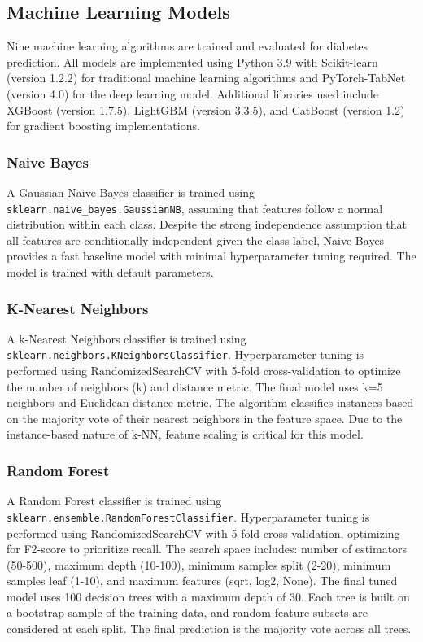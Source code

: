 \subsection{Machine Learning Models}

Nine machine learning algorithms are trained and evaluated for diabetes prediction. All models are implemented using Python 3.9 with Scikit-learn (version 1.2.2) for traditional machine learning algorithms and PyTorch-TabNet (version 4.0) for the deep learning model. Additional libraries used include XGBoost (version 1.7.5), LightGBM (version 3.3.5), and CatBoost (version 1.2) for gradient boosting implementations.

\subsubsection{Naive Bayes}

A Gaussian Naive Bayes classifier is trained using \texttt{sklearn.naive\_bayes.GaussianNB}, assuming that features follow a normal distribution within each class. Despite the strong independence assumption that all features are conditionally independent given the class label, Naive Bayes provides a fast baseline model with minimal hyperparameter tuning required. The model is trained with default parameters.

\subsubsection{K-Nearest Neighbors}

A k-Nearest Neighbors classifier is trained using \texttt{sklearn.neighbors.KNeighborsClassifier}. Hyperparameter tuning is performed using RandomizedSearchCV with 5-fold cross-validation to optimize the number of neighbors (k) and distance metric. The final model uses k=5 neighbors and Euclidean distance metric. The algorithm classifies instances based on the majority vote of their nearest neighbors in the feature space. Due to the instance-based nature of k-NN, feature scaling is critical for this model.

\subsubsection{Random Forest}

A Random Forest classifier is trained using \texttt{sklearn.ensemble.RandomForestClassifier}. Hyperparameter tuning is performed using RandomizedSearchCV with 5-fold cross-validation, optimizing for F2-score to prioritize recall. The search space includes: number of estimators (50-500), maximum depth (10-100), minimum samples split (2-20), minimum samples leaf (1-10), and maximum features (sqrt, log2, None). The final tuned model uses 100 decision trees with a maximum depth of 30. Each tree is built on a bootstrap sample of the training data, and random feature subsets are considered at each split. The final prediction is the majority vote across all trees.


